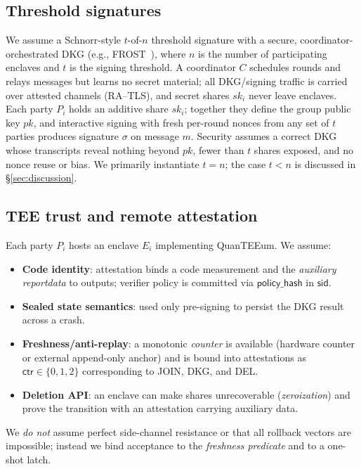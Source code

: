 \documentclass[runningheads,orivec]{llncs}
\newcommand{\prot}{\textsf{QuanTEEum}}
\begin{document}
\subsection{Threshold signatures}
We assume a Schnorr-style $t$-of-$n$ threshold signature with a secure, coordinator-orchestrated DKG (e.g., FROST~\cite{komlo2020frost}), where $n$ is the number of participating enclaves and $t$ is the signing threshold. A coordinator $C$ schedules rounds and relays messages but learns no secret material; all DKG/signing traffic is carried over attested channels (RA--TLS), and secret shares $sk_i$ never leave enclaves. Each party $P_i$ holds an additive share $sk_i$; together they define the group public key $pk$, and interactive signing with fresh per-round nonces from any set of $t$ parties produces signature $\sigma$ on message $m$. Security assumes a correct DKG whose transcripts reveal nothing beyond $pk$, fewer than $t$ shares exposed, and no nonce reuse or bias. We primarily instantiate $t{=}n$; the case $t{<}n$ is discussed in \S\ref{sec:discussion}.

\subsection{TEE trust and remote attestation}
Each party $P_i$ hosts an enclave $E_i$ implementing \prot{}. We assume:
\begin{itemize}[leftmargin=*,itemsep=0.25em]
  \item \textbf{Code identity}: attestation binds a code measurement and the \emph{auxiliary reportdata} to outputs; verifier policy is committed via $\mathsf{policy\_hash}$ in $\mathsf{sid}$.
  \item \textbf{Sealed state semantics}: used only pre-signing to persist the DKG result across a crash.
  \item \textbf{Freshness/anti-replay}: a monotonic \emph{counter} is available (hardware counter or external append-only anchor) and is bound into attestations as $\mathsf{ctr}\in\{0,1,2\}$ corresponding to JOIN, DKG, and DEL.
  \item \textbf{Deletion API}: an enclave can make shares unrecoverable (\emph{zeroization}) and prove the transition with an attestation carrying auxiliary data.
\end{itemize}
We \emph{do not} assume perfect side-channel resistance or that all rollback vectors are impossible; instead we bind acceptance to the \emph{freshness predicate} and to a one-shot latch.
\end{document}
